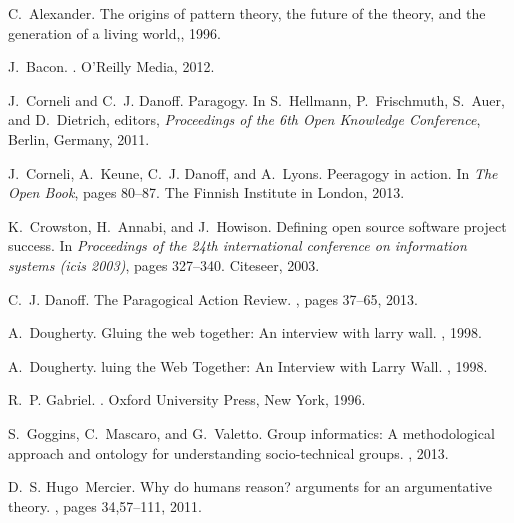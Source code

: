 \documentclass{acm_proc_article-sp}
\begin{document}
%
%
%
%


\begin{thebibliography}{10}


C.~Alexander.
\newblock The origins of pattern theory, the future of the theory, and the
  generation of a living world,, 1996.

J.~Bacon.
.
\newblock O'Reilly Media, 2012.

J.~Corneli and C.~J. Danoff.
\newblock Paragogy.
\newblock In S.~Hellmann, P.~Frischmuth, S.~Auer, and D.~Dietrich, editors,
  {\em Proceedings of the 6th Open Knowledge Conference}, Berlin, Germany,
  2011.

J.~Corneli, A.~Keune, C.~J. Danoff, and A.~Lyons.
\newblock Peeragogy in action.
\newblock In {\em The Open Book}, pages 80--87. The Finnish Institute in
  London, 2013.

K.~Crowston, H.~Annabi, and J.~Howison.
\newblock Defining open source software project success.
\newblock In {\em Proceedings of the 24th international conference on
  information systems (icis 2003)}, pages 327--340. Citeseer, 2003.

C.~J. Danoff.
\newblock The {P}aragogical {A}ction {R}eview.
, pages
  37--65, 2013.

A.~Dougherty.
\newblock Gluing the web together: An interview with larry wall.
, 1998.

A.~Dougherty.
luing the {W}eb {T}ogether: {A}n {I}nterview with {L}arry {W}all.
, 1998.

R.~P. Gabriel.
.
\newblock Oxford University Press, New York, 1996.

S.~Goggins, C.~Mascaro, and G.~Valetto.
\newblock Group informatics: A methodological approach and ontology for
  understanding socio-technical groups.
, 2013.

D.~S. Hugo~Mercier.
\newblock Why do humans reason? arguments for an argumentative theory.
, pages 34,57--111, 2011.


\end{thebibliography}
\end{document}

